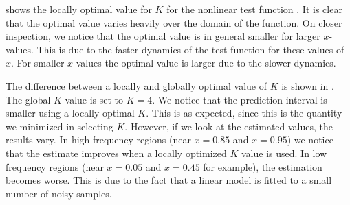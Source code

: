  shows the locally optimal value for $K$ for the nonlinear test function . It is clear that the optimal value varies heavily over the domain of the function. On closer inspection, we notice that the optimal value is in general smaller for larger $x$-values. This is due to the faster dynamics of the test function for these values of $x$. For smaller $x$-values the optimal value is larger due to the slower dynamics.

The difference between a locally and globally optimal value of $K$ is shown in . The global $K$ value is set to $K=4$. We notice that the prediction interval is smaller using a locally optimal $K$. This is as expected, since this is the quantity we minimized in selecting $K$. However, if we look at the estimated values, the results vary. In high frequency regions (near $x=0.85$ and $x=0.95$) we notice that the estimate improves when a locally optimized $K$ value is used. In low frequency regions (near $x=0.05$ and $x=0.45$ for example), the estimation becomes worse. This is due to the fact that a linear model is fitted to a small number of noisy samples. 

